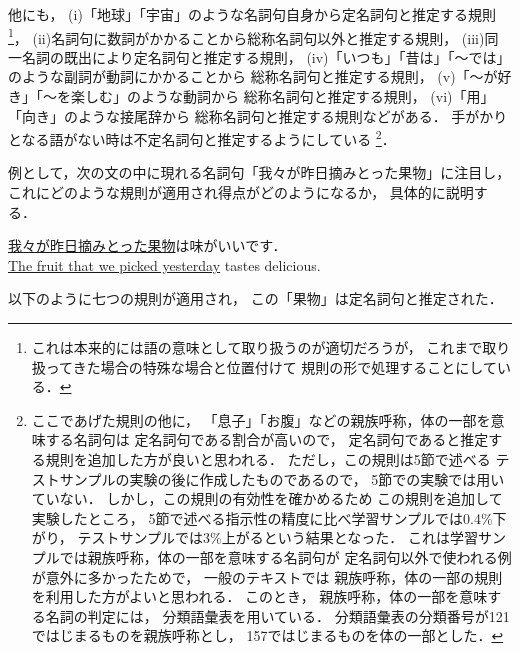 他にも，
(i)「地球」「宇宙」のような名詞句自身から定名詞句と推定する規則
\footnote{
\label{foot:tikyuu}
これは本来的には語の意味として取り扱うのが適切だろうが，
    これまで取り扱ってきた場合の特殊な場合と位置付けて
    規則の形で処理することにしている．
}，
(ii)名詞句に数詞がかかることから総称名詞句以外と推定する規則，
(iii)同一名詞の既出により定名詞句と推定する規則，
(iv)「いつも」「昔は」「〜では」のような副詞が動詞にかかることから
総称名詞句と推定する規則，
(v)「〜が好き」「〜を楽しむ」のような動詞から
総称名詞句と推定する規則，
(vi)「用」「向き」のような接尾辞から
総称名詞句と推定する規則などがある．
手がかりとなる語がない時は不定名詞句と推定するようにしている
\footnote{
      ここであげた規則の他に，
      「息子」「お腹」などの親族呼称，体の一部を意味する名詞句は
      定名詞句である割合が高いので，
      定名詞句であると推定する規則を追加した方が良いと思われる．
      ただし，この規則は5節で述べる
      テストサンプルの実験の後に作成したものであるので，
      5節での実験では用いていない．
      しかし，この規則の有効性を確かめるため
      この規則を追加して実験したところ，
      5節で述べる指示性の精度に比べ学習サンプルでは0.4\%下がり，
      テストサンプルでは3\%上がるという結果となった．
      これは学習サンプルでは親族呼称，体の一部を意味する名詞句が
      定名詞句以外で使われる例が意外に多かったためで，
      一般のテキストでは
      親族呼称，体の一部の規則を利用した方がよいと思われる．
      このとき，
      親族呼称，体の一部を意味する名詞の判定には，
      分類語彙表\cite{Kokuritukokugokenkyusho1964}を用いている．
      分類語彙表の分類番号が121ではじまるものを親族呼称とし，
      157ではじまるものを体の一部とした．
}．

\vspace{3mm}

例として，次の文の中に現れる名詞句「我々が昨日摘みとった果物」に注目し，
これにどのような規則が適用され得点がどのようになるか，
具体的に説明する．

\newpage
\noindent
\underline{我々が昨日摘みとった果物}は味がいいです．\\
\underline{The fruit that we picked yesterday} tastes delicious.

\bigskip
\vspace*{-.5mm}
以下のように七つの規則が適用され，
この「果物」は定名詞句と推定された．

